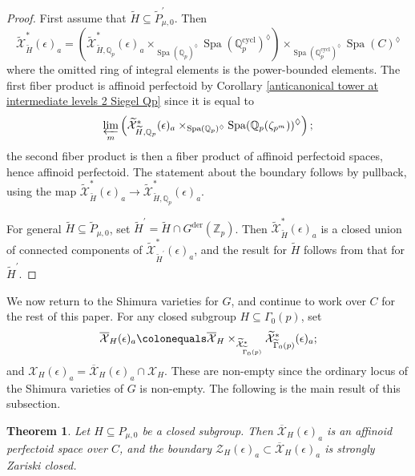 \documentclass{amsart}
\newtheorem{thm}[subsubsection]{Theorem}
\theoremstyle{remark}
\numberwithin{equation}{subsection}
\newcommand{\Q}{\QQ}
\newcommand{\Z}{\ZZ}
\newcommand{\QQ}{{\mathbb Q}}
\newcommand{\ZZ}{{\mathbb Z}}
\newcommand{\cX}{{\mathcal X}}
\newcommand{\cZ}{{\mathcal Z}}
\newcommand{\Zp}{\Z_p}
\newcommand{\Qp}{\Q_p}
\DeclareMathOperator{\Spa}{Spa}
\newcommand*{\invlim}{\varprojlim}
\newcommand{\cycl}{\mathrm{cycl}}
\newcommand{\tGam}{\widetilde{\Gamma}}
\newcommand{\tH}{\widetilde{H}}
\newcommand{\tP}{\widetilde{P}}
\newcommand{\ocX}{\overline{\mathcal{X}}}
\newcommand{\wt}{\widetilde}
\newcommand{\sub}{\subseteq}
\newcommand{\defeq}{\colonequals}
\renewcommand{\(}{\left(}
\renewcommand{\)}{\right)}
\begin{document}
\begin{proof}
First assume that $\tH \sub \tP_{\mu,0}^{\prime}$. Then 
\[
\wt{\cX}^{\ast}_{\tH}(\epsilon)_a = \left( \wt{\cX}^{\ast}_{\tH,\Qp}(\epsilon)_a \times_{\Spa(\Qp)^{\lozenge}} \Spa(\Qp^\cycl)^{\lozenge} \right) \times_{\Spa(\Qp^\cycl)^{\lozenge}} \Spa(C)^{\lozenge}
\]
where the omitted ring of integral elements is the power-bounded elements. The first fiber product is affinoid perfectoid by Corollary \ref{anticanonical tower at intermediate levels 2 Siegel Qp} since it is equal to
\[
\invlim_{m} \left( \wt{\cX}^{\ast}_{\tH,\Qp}(\epsilon)_a \times_{\Spa(\Qp)^{\lozenge}} \Spa(\Qp(\zeta_{p^m}))^{\lozenge} \right);
\]
the second fiber product is then a fiber product of affinoid perfectoid spaces, hence affinoid perfectoid. The statement about the boundary follows by pullback, using the map $\wt{\cX}^{\ast}_{\tH}(\epsilon)_a \to \wt{\cX}^{\ast}_{\tH,\Qp}(\epsilon)_a$.

\medskip

For general $\tH \sub \tP_{\mu,0}$, set $\tH^{\prime} = \tH \cap G^\mathrm{der}(\Zp)$. Then $\wt{\cX}^{\ast}_{\tH}(\epsilon)_a$ is a closed union of connected components of $\wt{\cX}^{\ast}_{\tH^{\prime}}(\epsilon)_a$, and the result for $\tH$ follows from that for $\tH^{\prime}$.
\end{proof}

We now return to the Shimura varieties for $G$, and continue to work over $C$ for the rest of this paper. For any closed subgroup $H \sub \Gamma_{0}(p)$, set
\[
 \ocX_{H}(\epsilon)_{a} \defeq \ocX_{H} \times_{\wt{\cX}^{\ast}_{\tGam_{0}(p)}} \wt{\cX}^{\ast}_{\tGam_{0}(p)}(\epsilon)_{a};
 \]
and $\cX_{H}(\epsilon)_{a}= \ocX_{H}(\epsilon)_{a} \cap \cX_{H}$. These are non-empty since the ordinary locus of the Shimura varieties of $G$ is non-empty. The following is the main result of this subsection.

\begin{thm}\label{anticanonical tower at intermediate levels 2} Let $H \sub P_{\mu,0}$ be a closed subgroup. Then $\ocX_{H}(\epsilon)_{a}$ is an affinoid perfectoid space over $C$, and the boundary $\cZ_{H}(\epsilon)_a \subset \ocX_{H}(\epsilon)_a$ is strongly Zariski closed. 
\end{thm}
\end{document}
